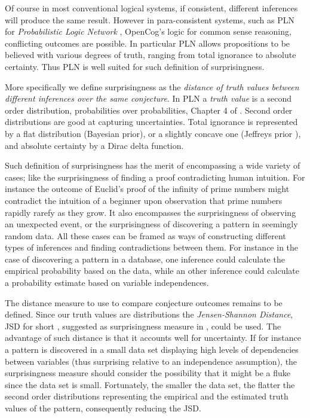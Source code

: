 \documentclass[runningheads]{llncs}
\begin{document}
Of course in most conventional logical systems, if consistent,
different inferences will produce the same result. However in
para-consistent systems, such as PLN for \emph{Probabilistic Logic
  Network} \cite{Goertzel2009PLN}, OpenCog's logic for common sense
reasoning, conflicting outcomes are possible. In particular PLN allows
propositions to be believed with various degrees of truth, ranging
from total ignorance to absolute certainty. Thus PLN is well suited
for such definition of surprisingness.

More specifically we define surprisingness as the \emph{distance of
  truth values between different inferences over the same
  conjecture}. In PLN a \emph{truth value} is a second order
distribution, probabilities over probabilities, Chapter 4 of
\cite{Goertzel2009PLN}. Second order distributions are good at
capturing uncertainties. Total ignorance is represented by a flat
distribution (Bayesian prior), or a slightly concave one (Jeffreys
prior \cite{Jeffreys46Invariant}), and absolute certainty by a Dirac
delta function.

Such definition of surprisingness has the merit of encompassing a wide
variety of cases; like the surprisingness of finding a proof
contradicting human intuition. For instance the outcome of Euclid's
proof of the infinity of prime numbers might contradict the intuition
of a beginner upon observation that prime numbers rapidly rarefy as
they grow. It also encompasses the surprisingness of observing an
unexpected event, or the surprisingness of discovering a pattern in
seemingly random data. All these cases can be framed as ways of
constructing different types of inferences and finding contradictions
between them. For instance in the case of discovering a pattern in a
database, one inference could calculate the empirical probability
based on the data, while an other inference could calculate a
probability estimate based on variable independences.

The distance measure to use to compare conjecture outcomes remains to
be defined. Since our truth values are distributions the
\emph{Jensen-Shannon Distance}, JSD for short \cite{Endres2003A},
suggested as surprisingness measure in \cite{Pienta2015AN},
could be used. The advantage of such distance is that it accounts well
for uncertainty. If for instance a pattern is discovered in a small
data set displaying high levels of dependencies between variables
(thus surprising relative to an independence assumption), the
surprisingness measure should consider the possibility that it might
be a fluke since the data set is small. Fortunately, the smaller the
data set, the flatter the second order distributions representing the
empirical and the estimated truth values of the pattern, consequently
reducing the JSD.
\end{document}
